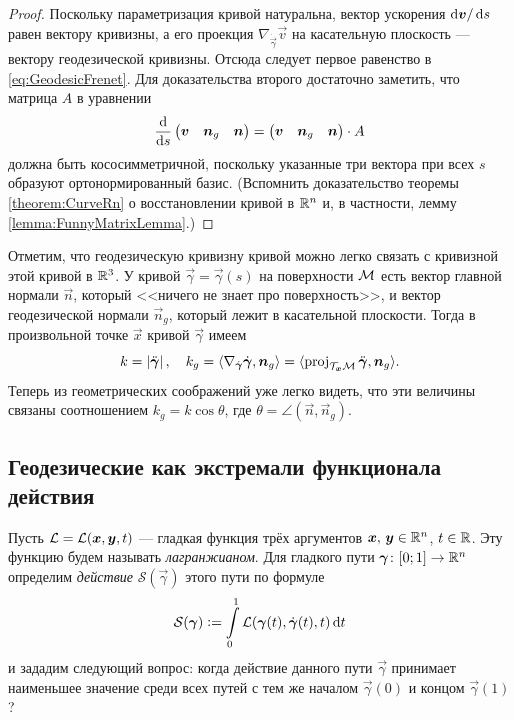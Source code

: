\begin{proof}
	Поскольку параметризация кривой натуральна, вектор ускорения $\mathop{}\!\mathrm{d}\boldsymbol{v} / \mathop{}\!\mathrm{d} s$ равен вектору кривизны, а его проекция $\nabla_{\dot{\vec{\gamma}}}\vec{v}$ на касательную плоскость --- вектору геодезической кривизны. Отсюда следует первое равенство в \eqref{eq:GeodesicFrenet}. Для доказательства второго достаточно заметить, что матрица $A$ в уравнении
	\[
		\frac{\mathop{}\!\mathrm{d}}{\mathop{}\!\mathrm{d} s}
		\begin{pmatrix}
			\boldsymbol{v} & \boldsymbol{n}_g & \boldsymbol{n}
		\end{pmatrix} = 
		\begin{pmatrix}
			\boldsymbol{v} & \boldsymbol{n}_g & \boldsymbol{n}
		\end{pmatrix} \cdot A
	\]
	должна быть кососимметричной, поскольку указанные три вектора при всех $s$ образуют ортонормированный базис. (Вспомнить доказательство теоремы \ref{theorem:CurveRn} о восстановлении кривой в $\mathbb{R}^n$ и, в частности, лемму \ref{lemma:FunnyMatrixLemma}.)
\end{proof}

Отметим, что геодезическую кривизну кривой можно легко связать с кривизной этой кривой в $\mathbb{R}^3$. У кривой $\vec{\gamma} = \vec{\gamma}(s)$ на поверхности $\mathcal{M}$ есть вектор главной нормали $\vec{n}$, который <<ничего не знает про поверхность>>, и вектор геодезической нормали $\vec{n}_g$, который лежит в касательной плоскости. Тогда в произвольной точке $\vec{x}$ кривой $\vec{\gamma}$ имеем
\[ %
	k = \abs{\ddot{\vec{\gamma}}},\quad k_g = \langle\nabla_{\dot{\vec{\gamma}}}\dot{\vec{\gamma}}, \vec{n}_g\rangle = \langle\proj_{\T_{\vec{x}}\M}\ddot{\vec{\gamma}}, \vec{n}_g\rangle.
\]
Теперь из геометрических соображений уже легко видеть, что эти величины связаны соотношением $k_g = k\cos\theta$, где $\theta = \angle(\vec{n}, \vec{n}_g)$.

\subsection{Геодезические как экстремали функционала действия}

Пусть $\mathcal{L} = \mathcal{L}(\boldsymbol{x}, \boldsymbol{y}, t)$ --- гладкая функция трёх аргументов $\boldsymbol{x},\,\boldsymbol{y} \in \mathbb{R}^n$, $t \in \mathbb{R}$. Эту функцию будем называть \textit{лагранжианом}. Для гладкого пути $\boldsymbol{\gamma}\colon [0; 1] \to \mathbb{R}^n$ определим \textit{действие} $\mathcal{S}(\vec{\gamma})$ этого пути по формуле
\begin{equation} \label{eq:Action}
	\mathcal{S}(\boldsymbol{\gamma}) \vcentcolon = \int\limits_0^1\mathcal{L}(\boldsymbol{\gamma}(t), \dot{\boldsymbol{\gamma}}(t), t)\mathop{}\!\mathrm{d} t
\end{equation}
и зададим следующий вопрос: когда действие данного пути $\vec{\gamma}$ принимает наименьшее значение среди всех путей с тем же началом $\vec{\gamma}(0)$ и концом $\vec{\gamma}(1)$?

